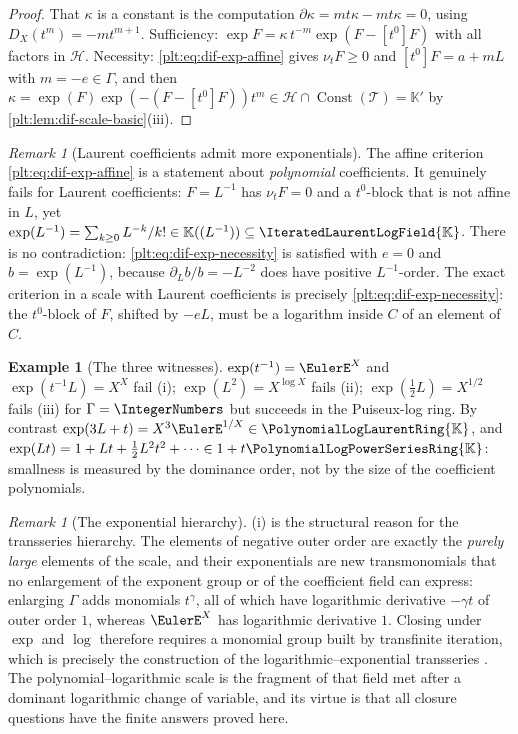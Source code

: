 \documentclass[11pt,oneside]{article}
\theoremstyle{plain}
\theoremstyle{definition}
\newtheorem{example}[theorem]{Example}
\theoremstyle{remark}
\newtheorem{remark}[theorem]{Remark}
\newcommand{\K}{\mathbb{K}}
\newcommand{\PLpow}{\PolynomialLogPowerSeriesRing{\K}}   %
\newcommand{\PLlau}{\PolynomialLogLaurentRing{\K}}       %
\newcommand{\PLit}{\IteratedLaurentLogField{\K}}         %
\newcommand{\ordt}{\nu_{t}}                              %
\newcommand{\DX}{D_{X}}                                  %
\begin{document}
\begin{proof}
That \(\kappa\) is a constant is the computation
\(\partial\kappa=mt\kappa-mt\kappa=0\), using \(\DX(t^{m})=-mt^{m+1}\).
Sufficiency: \(\exp F=\kappa\,t^{-m}\exp(F-[t^{0}]F)\) with all factors in
\(\mathcal H\).  Necessity: \cref{plt:eq:dif-exp-affine} gives \(\ordt F\ge0\)
and \([t^{0}]F=a+mL\) with \(m=-e\in\Gamma\), and then
\(\kappa=\exp(F)\exp(-(F-[t^{0}]F))t^{m}\in\mathcal H\cap
\operatorname{Const}(\mathcal T)=\K'\) by
\cref{plt:lem:dif-scale-basic}(iii).
\end{proof}

\begin{remark}[Laurent coefficients admit more exponentials]
\label{plt:rmk:dif-exp-laurent}
The affine criterion \cref{plt:eq:dif-exp-affine} is a statement about
\emph{polynomial} coefficients.  It genuinely fails for Laurent coefficients:
\(F=L^{-1}\) has \(\ordt F=0\) and a \(t^{0}\)-block that is not affine in
\(L\), yet
\(\exp(L^{-1})=\sum_{k\ge0}L^{-k}/k!\in\K((L^{-1}))\subseteq\PLit\).  There is
no contradiction: \cref{plt:eq:dif-exp-necessity} is satisfied with
\(e=0\) and \(b=\exp(L^{-1})\), because \(\partial_{L}b/b=-L^{-2}\) does have
positive \(L^{-1}\)-order.  The exact criterion in a scale with Laurent
coefficients is precisely \cref{plt:eq:dif-exp-necessity}: the \(t^{0}\)-block
of \(F\), shifted by \(-eL\), must be a logarithm inside \(C\) of an element of
\(C\).
\end{remark}

\begin{example}[The three witnesses]\label{plt:ex:dif-exp-witnesses}
\(\exp(t^{-1})=\EulerE^{X}\) and \(\exp(t^{-1}L)=X^{X}\) fail (i);
\(\exp(L^{2})=X^{\log X}\) fails (ii); \(\exp(\tfrac12L)=X^{1/2}\) fails (iii)
for \(\Gamma=\IntegerNumbers\) but succeeds in the Puiseux-log ring.  By
contrast \(\exp(3L+t)=X^{3}\EulerE^{1/X}\in\PLlau\), and
\(\exp(Lt)=1+Lt+\tfrac12L^{2}t^{2}+\cdots\in1+t\PLpow\): smallness is measured
by the dominance order, not by the size of the coefficient polynomials.
\end{example}

\begin{remark}[The exponential hierarchy]\label{plt:rmk:dif-hierarchy}
(i) is the structural reason for the
transseries hierarchy.  The elements of negative outer order are exactly the
\emph{purely large} elements of the scale, and their exponentials are new
transmonomials that no enlargement of the exponent group or of the coefficient
field can express: enlarging \(\Gamma\) adds monomials \(t^{\gamma}\), all of
which have logarithmic derivative \(-\gamma t\) of outer order \(1\), whereas
\(\EulerE^{X}\) has logarithmic derivative \(1\).  Closing under \(\exp\) and
\(\log\) therefore requires a monomial group built by transfinite iteration,
which is precisely the construction of the logarithmic--exponential
transseries \cite{adh-book,vanderhoeven-book,edgar-beginners,costin-book}.  The
polynomial--logarithmic scale is the fragment of that field met after a
dominant logarithmic change of variable, and its virtue is that all closure
questions have the finite answers proved here.
\end{remark}
\end{document}
